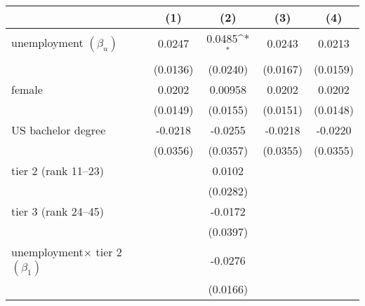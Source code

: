 \begin{table}[htbp]\centering
	\def\sym#1{\ifmmode^{#1}\else\(^{#1}\)\fi}
		\begin{adjustbox}{max width=0.5\textwidth}
\begin{tabular}{l*{4}{c}}
\hline\hline
            &\multicolumn{1}{c}{(1)}&\multicolumn{1}{c}{(2)}&\multicolumn{1}{c}{(3)}&\multicolumn{1}{c}{(4)}\\
\hline
unemployment  $\left( \beta_u \right)$    &      0.0247         &      0.0485\sym{*}  &           0.0243         &      0.0213         \\
            &    (0.0136)         &    (0.0240)          &    (0.0167)         &    (0.0159)         \\
[1em]
female &      0.0202         &     0.00958                &      0.0202         &      0.0202         \\
            &    (0.0149)         &    (0.0155)                &    (0.0151)         &    (0.0148)         \\
[1em]
US bachelor degree   &     -0.0218         &     -0.0255             &     -0.0218         &     -0.0220         \\
            &    (0.0356)         &    (0.0357)               &    (0.0355)         &    (0.0355)         \\
[1em]
tier 2 (rank 11--23)    &                     &      0.0102         &                     &                                         \\
            &                     &    (0.0282)         &                     &                                          \\
[1em]
tier 3 (rank 24--45)     &                     &     -0.0172         &                     &                                          \\
            &                     &    (0.0397)         &                     &                                          \\
[1em]
unemployment$\times$ tier 2  $\left( \beta_1 \right)$&                     &     -0.0276         &                     &                                          \\
            &                     &    (0.0166)         &                     &                                         \\

\end{tabular}
\end{adjustbox}
\end{table}
